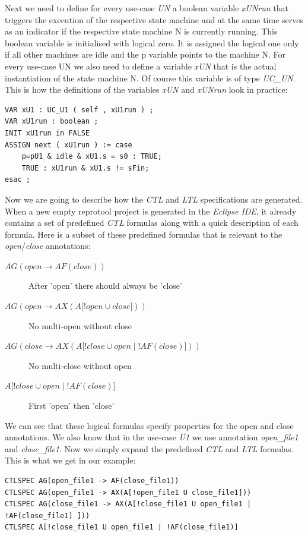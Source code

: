 Next we need to define for every use-case \emph{UN} a boolean variable \emph{xUNrun} that triggers the execution of the respective state machine
and at the same time serves as an indicator if the respective state machine N is currently running. This boolean variable is
initialised with logical zero. It is assigned the logical one only if all other machines are idle and the p variable points to the
machine N. For every use-case UN we also need to define a variable \emph{xUN} that is the actual instantiation of the state machine N.
Of course this variable is of type \emph{UC\_UN}. This is how the definitions of the variables \emph{xUN} and \emph{xUNrun} look in practice:
\begin{lstlisting}
VAR xU1 : UC_U1 ( self , xU1run ) ;
VAR xU1run : boolean ;
INIT xU1run in FALSE
ASSIGN next ( xU1run ) := case
	p=pU1 & idle & xU1.s = s0 : TRUE;
	TRUE : xU1run & xU1.s != sFin;
esac ;
\end{lstlisting}

Now we are going to describe how the \emph{CTL} and \emph{LTL} specifications are generated. When a new empty reprotool project is generated in the
\emph{Eclipse IDE}, it already contains a set of predefined \emph{CTL} formulas along with a quick description of each formula. Here is a subset of
these predefined formulas that is relevant to the \emph{open}/\emph{close} annotations:

\begin{description}
 \item [$AG(open \rightarrow AF(close))$] After 'open' there should always be 'close'
 \item [$AG(open \rightarrow AX(A\lbrack!open \cup close\rbrack))$] No multi-open without close
 \item [$AG(close \rightarrow AX(A\lbrack!close \cup open \mid !AF(close) \rbrack))$] No multi-close without open
 \item [$A\lbrack !close \cup open \mid !AF(close)\rbrack$] First 'open' then 'close'
\end{description}

We can see that these logical formulas specify properties for the open and close annotations. We also know that in the use-case \emph{U1} we
use annotation \emph{open\_file1} and \emph{close\_file1}. Now we simply expand the predefined \emph{CTL} and \emph{LTL} formulas. This is what we get in our
example:
\begin{lstlisting}
CTLSPEC AG(open_file1 -> AF(close_file1))
CTLSPEC AG(open_file1 -> AX(A[!open_file1 U close_file1]))
CTLSPEC AG(close_file1 -> AX(A[!close_file1 U open_file1 | !AF(close_file1) ]))
CTLSPEC A[!close_file1 U open_file1 | !AF(close_file1)]
\end{lstlisting}

